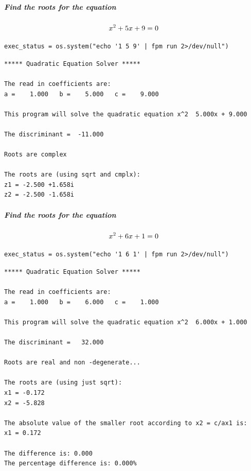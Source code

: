 \subparagraph{Find the roots for the equation \newline
}

\begin{equation}
\Large x^2 + 5x + 9 = 0
\end{equation}

\begin{verbatim}
exec_status = os.system("echo '1 5 9' | fpm run 2>/dev/null")
\end{verbatim}

\begin{verbatim}
***** Quadratic Equation Solver *****

The read in coefficients are:
a =    1.000   b =    5.000   c =    9.000

This program will solve the quadratic equation x^2  5.000x + 9.000

The discriminant =  -11.000

Roots are complex

The roots are (using sqrt and cmplx):
z1 = -2.500 +1.658i
z2 = -2.500 -1.658i
\end{verbatim}

\subparagraph{Find the roots for the equation \newline
}

\begin{equation}
\Large x^2 + 6x + 1 = 0
\end{equation}

\begin{verbatim}
exec_status = os.system("echo '1 6 1' | fpm run 2>/dev/null")
\end{verbatim}

\begin{verbatim}
***** Quadratic Equation Solver *****

The read in coefficients are:
a =    1.000   b =    6.000   c =    1.000

This program will solve the quadratic equation x^2  6.000x + 1.000

The discriminant =   32.000

Roots are real and non -degenerate...

The roots are (using just sqrt):
x1 = -0.172
x2 = -5.828

The absolute value of the smaller root according to x2 = c/ax1 is:
x1 = 0.172

The difference is: 0.000
The percentage difference is: 0.000%
\end{verbatim}